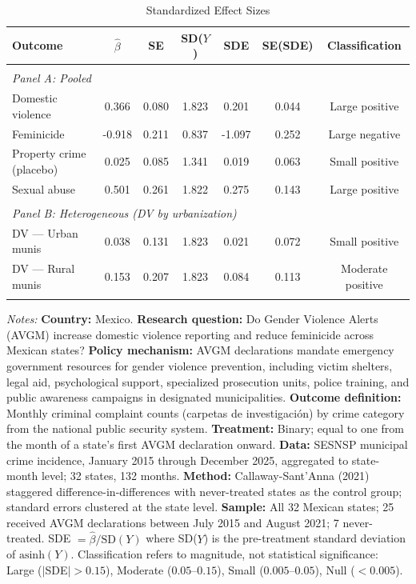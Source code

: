 \begin{table}[!t]
\centering
\caption{Standardized Effect Sizes}
\label{tab:sde}
\begin{threeparttable}
\begin{tabular}{lcccccc}
\hline\hline
Outcome & $\hat{\beta}$ & SE & SD($Y$) & SDE & SE(SDE) & Classification \\
\hline
\\[-1.8ex]
\multicolumn{7}{l}{\textit{Panel A: Pooled}} \\
Domestic violence & 0.366 & 0.080 & 1.823 & 0.201 & 0.044 & Large positive \\
Feminicide & -0.918 & 0.211 & 0.837 & -1.097 & 0.252 & Large negative \\
Property crime (placebo) & 0.025 & 0.085 & 1.341 & 0.019 & 0.063 & Small positive \\
Sexual abuse & 0.501 & 0.261 & 1.822 & 0.275 & 0.143 & Large positive \\
\\[-1.8ex]
\multicolumn{7}{l}{\textit{Panel B: Heterogeneous (DV by urbanization)}} \\
DV --- Urban munis & 0.038 & 0.131 & 1.823 & 0.021 & 0.072 & Small positive \\
DV --- Rural munis & 0.153 & 0.207 & 1.823 & 0.084 & 0.113 & Moderate positive \\
\\[-1.8ex]
\hline\hline
\end{tabular}
\begin{tablenotes}
\item \textit{Notes:} \textbf{Country:} Mexico. \textbf{Research question:} Do Gender Violence Alerts (AVGM) increase domestic violence reporting and reduce feminicide across Mexican states? \textbf{Policy mechanism:} AVGM declarations mandate emergency government resources for gender violence prevention, including victim shelters, legal aid, psychological support, specialized prosecution units, police training, and public awareness campaigns in designated municipalities. \textbf{Outcome definition:} Monthly criminal complaint counts (carpetas de investigaci\'on) by crime category from the national public security system. \textbf{Treatment:} Binary; equal to one from the month of a state's first AVGM declaration onward. \textbf{Data:} SESNSP municipal crime incidence, January 2015 through December 2025, aggregated to state-month level; 32 states, 132 months. \textbf{Method:} Callaway-Sant'Anna (2021) staggered difference-in-differences with never-treated states as the control group; standard errors clustered at the state level. \textbf{Sample:} All 32 Mexican states; 25 received AVGM declarations between July 2015 and August 2021; 7 never-treated. SDE $= \hat{\beta} / \text{SD}(Y)$ where SD($Y$) is the pre-treatment standard deviation of $\text{asinh}(Y)$. Classification refers to magnitude, not statistical significance: Large ($|$SDE$| > 0.15$), Moderate ($0.05$--$0.15$), Small ($0.005$--$0.05$), Null ($< 0.005$).
\end{tablenotes}
\end{threeparttable}
\end{table}

